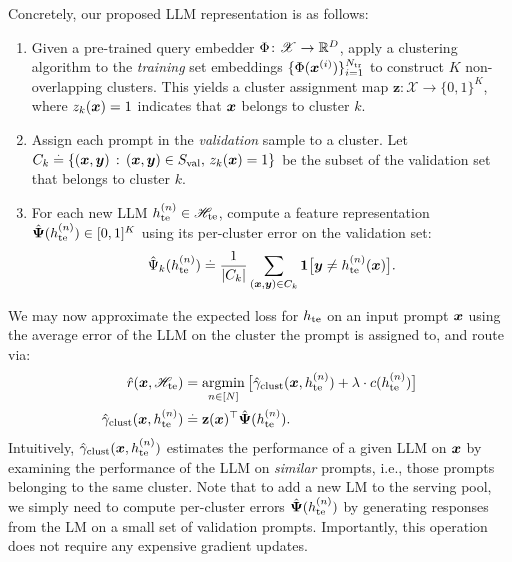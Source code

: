 Concretely, our proposed LLM representation is as follows:
\begin{enumerate}[label=(\roman*),itemsep=0pt,topsep=0pt,leftmargin=16pt]
\item Given a pre-trained query embedder 
$\Phi \colon \mathscr{X} \to \mathbb{R}^D$, 
apply a clustering algorithm to the \emph{training} set embeddings 
$\{\Phi(\boldsymbol{x}^{(i)})\}_{i=1}^{N_{\textrm{tr}}}$
to construct $K$ non-overlapping clusters.
This yields a cluster assignment map
$\mathbf{z}\colon\mathscr{X}\to\{0,1\}^K$, where $z_k(\boldsymbol{x}) = 1$ indicates that $\boldsymbol{x}$ belongs to cluster $k$.
\item Assign each prompt in the \emph{validation} sample to a cluster. Let $C_{k}\stackrel{.}{=}\{(\boldsymbol{x}, \boldsymbol{y})\,:\,(\boldsymbol{x}, \boldsymbol{y}) \in S_{\textrm{val}},\, z_{k}(\boldsymbol{x})=1\}$ be the subset of the validation set that belongs to cluster $k$.
\item For each new LLM $h_{\mathrm{te}}^{( n )} \in \mathscr{H}_{\mathrm{te}}$, compute a feature representation $\hat{\boldsymbol{\Psi}}( h_{\mathrm{te}}^{( n )} ) \in [0,1]^{K}$ 
using its per-cluster error on the  validation set:
\begin{align}
\hat{\Psi}_{k}( h_{\mathrm{te}}^{( n )} )
\stackrel{.}{=}\frac{1}{|C_{k}|}\sum_{(\boldsymbol{x},\boldsymbol{y})\in C_{k}}\bm{1}\big[ \boldsymbol{y} \ne h_{\mathrm{te}}^{( n )}(\boldsymbol{x}) \big].
\label{eq:cluster_accs}
\end{align}
\vspace{-15pt}
\end{enumerate}

We may now approximate the expected loss for $h_{\mathrm{te}}$ on an input prompt $\boldsymbol{x}$ using the average error of the LLM on the cluster the prompt is assigned to, and route via:
\begin{equation}
\begin{aligned}
\hat{r}(\bx, \msetNew) & = \underset{n \in [ \numSetNew ]}{\argmin} \, \big[ \hat{\gamma}_{\cluster}(\bx, \hNew^{( n )} ) + \lambda\cdot c( \hNew^{( n )} ) \big]
\label{eq:cluster-routing}\\
\hat{\gamma}_{\cluster}(\bx, \hNew^{(n)}) &\defEq
\mathbf{z}( \boldsymbol{x} )^\top \hat{\LLMEmbed}(\hNew^{(n)}).%
\end{aligned}%
\end{equation}
Intuitively,
$\hat{\gamma}_{\text{clust}}(\boldsymbol{x}, h_{\mathrm{te}}^{( n )} )$ 
estimates the performance of a given LLM on $\boldsymbol{x}$
by examining the performance of the LLM on \emph{similar} prompts,
i.e.,
those prompts belonging to the same cluster.
Note that to add a new LM to
the serving pool, we simply need to
compute per-cluster errors $\hat{\boldsymbol{\Psi}}( h_{\mathrm{te}}^{( n )} )$ %
by generating responses
from the LM on a small set of validation prompts. 
Importantly, this operation
does not require any expensive gradient updates.






